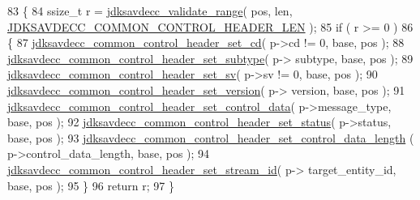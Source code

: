 \begin{DoxyCode}
83 \{
84     ssize\_t r = \hyperlink{group__util_ga9c02bdfe76c69163647c3196db7a73a1}{jdksavdecc\_validate\_range}( pos, len, 
      \hyperlink{group__jdksavdecc__avtp__common__control__header_gaae84052886fb1bb42f3bc5f85b741dff}{JDKSAVDECC\_COMMON\_CONTROL\_HEADER\_LEN} );
85     \textcolor{keywordflow}{if} ( r >= 0 )
86     \{
87         \hyperlink{group__jdksavdecc__avtp__common__control__header_ga25637b3f3eeae369125694cd5692e606}{jdksavdecc\_common\_control\_header\_set\_cd}( p->cd != 0, base, 
      pos );
88         \hyperlink{group__jdksavdecc__avtp__common__control__header_ga4418723fafa2bb29fdd1237f17b0a150}{jdksavdecc\_common\_control\_header\_set\_subtype}( p->
      subtype, base, pos );
89         \hyperlink{group__jdksavdecc__avtp__common__control__header_ga8f4004578afa74518bedc4545cf437bb}{jdksavdecc\_common\_control\_header\_set\_sv}( p->sv != 0, base, 
      pos );
90         \hyperlink{group__jdksavdecc__avtp__common__control__header_ga8ae4ee3ac7223ea2ccbea0c94af25dc0}{jdksavdecc\_common\_control\_header\_set\_version}( p->
      version, base, pos );
91         \hyperlink{group__jdksavdecc__avtp__common__control__header_gaaa8fc67df8a6ca2ae198b00d444c2d02}{jdksavdecc\_common\_control\_header\_set\_control\_data}(
       p->message\_type, base, pos );
92         \hyperlink{group__jdksavdecc__avtp__common__control__header_ga1eb286068111e77cc1088b32a7517d76}{jdksavdecc\_common\_control\_header\_set\_status}( p->status, 
      base, pos );
93         \hyperlink{group__jdksavdecc__avtp__common__control__header_ga69f3cbdf2665d0649d4669b2b5d07b61}{jdksavdecc\_common\_control\_header\_set\_control\_data\_length}
      ( p->control\_data\_length, base, pos );
94         \hyperlink{group__jdksavdecc__avtp__common__control__header_ga162c572e62c324dab4911f46e750e261}{jdksavdecc\_common\_control\_header\_set\_stream\_id}( p->
      target\_entity\_id, base, pos );
95     \}
96     \textcolor{keywordflow}{return} r;
97 \}
\end{DoxyCode}


